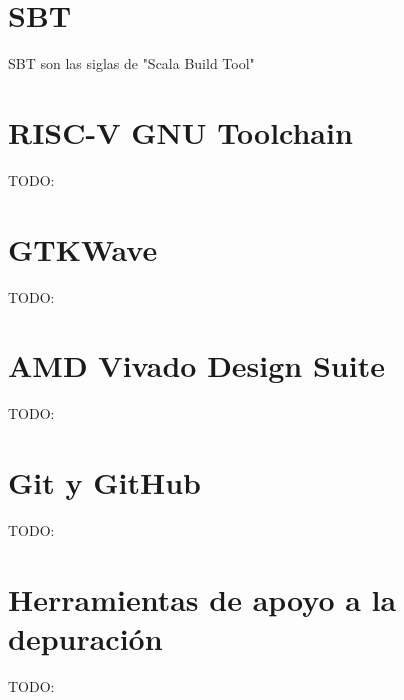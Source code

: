 \section{SBT}

SBT son las siglas de "Scala Build Tool"

\section{RISC-V GNU Toolchain}

TODO:

\section{GTKWave}

TODO:

\section{AMD Vivado Design Suite}

TODO:

\section{Git y GitHub}

TODO:

\section{Herramientas de apoyo a la depuración}

TODO: